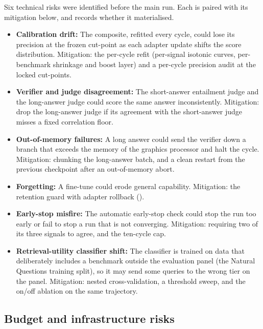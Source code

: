 Six technical risks were identified before the main run. Each is paired with its mitigation below, and  records whether it materialised.
\begin{itemize}
    \item \textbf{Calibration drift:} The composite, refitted every cycle, could lose its precision at the frozen cut-point as each adapter update shifts the score distribution. Mitigation: the per-cycle refit (per-signal isotonic curves, per-benchmark shrinkage and boost layer) and a per-cycle precision audit at the locked cut-points.
    \item \textbf{Verifier and judge disagreement:} The short-answer entailment judge and the long-answer judge could score the same answer inconsistently. Mitigation: drop the long-answer judge if its agreement with the short-answer judge misses a fixed correlation floor.
    \item \textbf{Out-of-memory failures:} A long answer could send the verifier down a branch that exceeds the memory of the graphics processor and halt the cycle. Mitigation: chunking the long-answer batch, and a clean restart from the previous checkpoint after an out-of-memory abort.
    \item \textbf{Forgetting:} A fine-tune could erode general capability. Mitigation: the retention guard with adapter rollback ().
    \item \textbf{Early-stop misfire:} The automatic early-stop check could stop the run too early or fail to stop a run that is not converging. Mitigation: requiring two of its three signals to agree, and the ten-cycle cap.
    \item \textbf{Retrieval-utility classifier shift:} The classifier is trained on data that deliberately includes a benchmark outside the evaluation panel (the Natural Questions training split), so it may send some queries to the wrong tier on the panel. Mitigation: nested cross-validation, a threshold sweep, and the on/off ablation on the same trajectory.
\end{itemize}

\subsection{Budget and infrastructure risks}
\label{sec:risk-budget}

